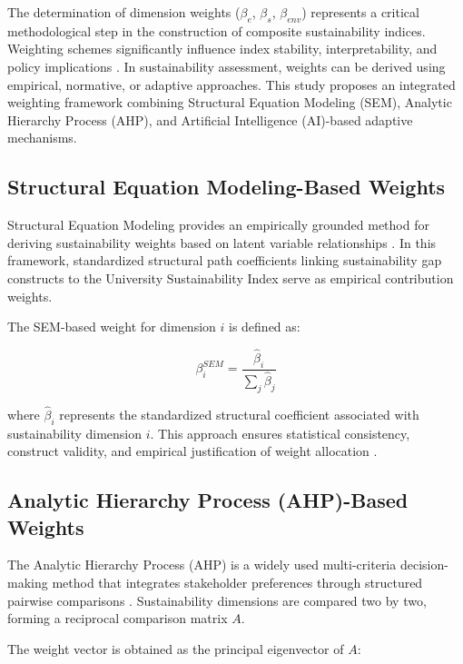 \documentclass[11pt,a4paper]{article}
\begin{document}
The determination of dimension weights ($\beta_e$, $\beta_s$, $\beta_{env}$) represents a critical methodological step in the construction of composite sustainability indices. Weighting schemes significantly influence index stability, interpretability, and policy implications \cite{Nardo2008,Saisana2005}. In sustainability assessment, weights can be derived using empirical, normative, or adaptive approaches. This study proposes an integrated weighting framework combining Structural Equation Modeling (SEM), Analytic Hierarchy Process (AHP), and Artificial Intelligence (AI)-based adaptive mechanisms.

\subsection{Structural Equation Modeling-Based Weights}

Structural Equation Modeling provides an empirically grounded method for deriving sustainability weights based on latent variable relationships \cite{Bollen1989,Kline2016,Hair2022}. In this framework, standardized structural path coefficients linking sustainability gap constructs to the University Sustainability Index serve as empirical contribution weights.

The SEM-based weight for dimension $i$ is defined as:

\begin{equation}
\beta_i^{SEM} = \frac{\hat{\beta}_i}{\sum_{j} \hat{\beta}_j}
\end{equation}

where $\hat{\beta}_i$ represents the standardized structural coefficient associated with sustainability dimension $i$. This approach ensures statistical consistency, construct validity, and empirical justification of weight allocation \cite{Joreskog1973,Diamantopoulos2006}.

\subsection{Analytic Hierarchy Process (AHP)-Based Weights}

The Analytic Hierarchy Process (AHP) is a widely used multi-criteria decision-making method that integrates stakeholder preferences through structured pairwise comparisons \cite{Saaty1980,Saaty2008}. Sustainability dimensions are compared two by two, forming a reciprocal comparison matrix $A$.

The weight vector is obtained as the principal eigenvector of $A$:
\end{document}
